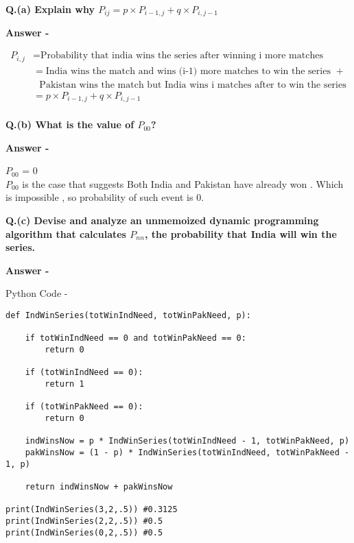 \documentclass[5pt]{article}
\begin{document}
\textbf{Q.(a) Explain why $P_{ij} = p \times P_{i-1,j} + q \times P_{i,j -1}$}
\setlength{\parskip}{1.2em}
\setlength{\parindent}{0em}

\textbf{Answer -}

\begin{align*}
P_{i,j}  & = \text{Probability that india wins the series after winning i more matches} \\
& =  \text{India wins the match and wins (i-1) more matches to win the series }  + \\
& ~~~\text{Pakistan wins the match but India wins i matches after to win the series} \\
& = p \times P_{i-1,j} + q \times P_{i, j -1} \\
\end{align*}


 
\textbf{Q.(b) What is the value of $P_{00}$?}

\setlength{\parskip}{1.2em}
\setlength{\parindent}{0em}

\textbf{Answer -}

$P_{00}$ = 0\\
 $P_{00}$ is the case that suggests Both India and Pakistan have already won . Which is impossible , so probability of such event is 0. 
 
\textbf{Q.(c) Devise and analyze an unmemoized dynamic programming algorithm that calculates $P_{nn}$, the probability that India will win the series.}
\setlength{\parskip}{1.2em}
\setlength{\parindent}{0em}

\textbf{Answer -}

Python Code -

\begin{lstlisting}
def IndWinSeries(totWinIndNeed, totWinPakNeed, p):

    if totWinIndNeed == 0 and totWinPakNeed == 0:
        return 0

    if (totWinIndNeed == 0):
        return 1

    if (totWinPakNeed == 0):
        return 0

    indWinsNow = p * IndWinSeries(totWinIndNeed - 1, totWinPakNeed, p)
    pakWinsNow = (1 - p) * IndWinSeries(totWinIndNeed, totWinPakNeed - 1, p)

    return indWinsNow + pakWinsNow

print(IndWinSeries(3,2,.5)) #0.3125
print(IndWinSeries(2,2,.5)) #0.5
print(IndWinSeries(0,2,.5)) #0.5
\end{lstlisting}
\end{document}
